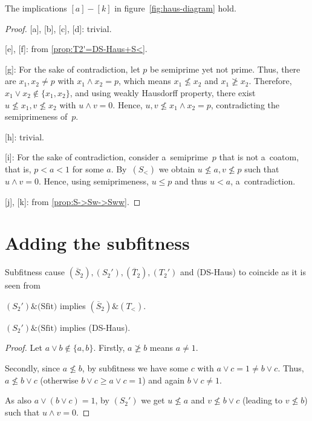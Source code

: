 \begin{prop}
  The implications $[a]-[k]$ in figure~\ref{fig:haus-diagram} hold.
\end{prop}
\begin{proof}

  [a], [b], [c], [d]:
  trivial.

  [e], [f]:
  from \ref{prop:T2'=DS-Haus+S<}.

  [g]:
  For the sake of contradiction, let $p$ be semiprime yet not prime.
  Thus, there are $x_1, x_2 \ne p$ with $x_1 \wedge x_2 = p$, which means
  $x_1\not\le x_2$ and $x_1\not\ge x_2$.
  Therefore, $x_1 \vee x_2 \not\in \{ x_1, x_2 \}$, and using weakly Hausdorff
  property, there exist $u\not\le x_1, v\not\le x_2$ with $u \wedge v = 0$.
  Hence, $u, v\not\le x_1 \wedge x_2 = p$, contradicting the semiprimeness
  of~$p$.

  [h]:
  trivial.

  [i]:
  For the sake of contradiction, consider a~semiprime~$p$ that is not a~coatom,
  that is, $p < a < 1$ for some $a$.
  By~$(S_<)$ we obtain $u\not\le a, v\not\le p$ such that $u \wedge v = 0$.
  Hence, using semiprimeness, $u \le p$ and thus $u < a$, a~contradiction.

  [j], [k]:
  from \ref{prop:S->Sw->Sww}.
\end{proof}

\section{Adding the subfitness}

Subfitness cause $(\overline{S}_2), (S_2'), (\overline{T}_2), (T_2')$ and
(DS-Haus) to coincide as it is seen from

\begin{thm} \label{thm:what-does-sfit-do}
  $(S_2')\&\text{(Sfit)}$ implies $(\overline{S}_2)\&(T_<)$.
\end{thm}

\begin{lem} \label{lem:S2'+Sfit->DSHaus}
  $(S_2')\&\text{(Sfit)}$ implies (DS-Haus).
\end{lem}
\begin{proof}
  Let $a \vee b\not\in \{ a, b \}$.
  Firstly, $a\not\ge b$ means $a \ne 1$.

  Secondly, since $a\not\le b$, by subfitness we have some $c$ with $a \vee c =
  1 \ne b \vee c$.
  Thus, $a\not\le b \vee c$ (otherwise $b \vee c \ge a \vee c = 1$) and again
  $b \vee c \ne 1$.

  As also $a \vee (b \vee c) = 1$, by $(S_2')$ we get $u\not\le a$ and
  $v\not\le b \vee c$ (leading to $v\not\le b$) such that $u \wedge v = 0$.
\end{proof}

